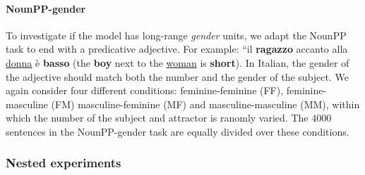 \paragraph{NounPP-gender}
To investigate if the model has long-range \emph{gender} units, we adapt the NounPP task to end with a predicative adjective.
For example: ``il \textbf{ragazzo} accanto alla \underline{donna} \`{e} \textbf{basso} (the \textbf{boy} next to the \underline{woman} is \textbf{short}).
In Italian, the gender of the adjective should match both the number and the gender of the subject.
We again consider four different conditions: feminine-feminine (FF), feminine-masculine (FM) masculine-feminine (MF) and masculine-masculine (MM), within which the number of the subject and attractor is ranomly varied.
The 4000 sentences in the NounPP-gender task are equally divided over these conditions.

\subsubsection{Nested experiments}




